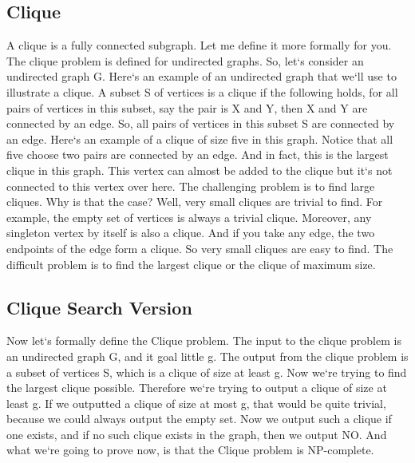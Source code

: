 \subsection{Clique}
A clique is a fully connected subgraph.
Let me define it more formally for you.
The clique problem is defined for undirected graphs.
So, let`s consider an undirected graph G\@.
Here`s an example of an undirected graph that we`ll use to illustrate a clique.
A subset S of vertices is a clique if the following holds, for all pairs of vertices in this subset, say the pair is X and Y, then X and Y are connected by an edge.
So, all pairs of vertices in this subset S are connected by an edge.
Here`s an example of a clique of size five in this graph.
Notice that all five choose two pairs are connected by an edge.
And in fact, this is the largest clique in this graph.
This vertex can almost be added to the clique but it`s not connected to this vertex over here.
The challenging problem is to find large cliques.
Why is that the case? Well, very small cliques are trivial to find.
For example, the empty set of vertices is always a trivial clique.
Moreover, any singleton vertex by itself is also a clique.
And if you take any edge, the two endpoints of the edge form a clique.
So very small cliques are easy to find.
The difficult problem is to find the largest clique or the clique of maximum size.

\subsection{Clique  Search Version}
Now let`s formally define the Clique problem.
The input to the clique problem is an undirected graph G, and it goal little g.
The output from the clique problem is a subset of vertices S, which is a clique of size at least g.
Now we`re trying to find the largest clique possible.
Therefore we`re trying to output a clique of size at least g.
If we outputted a clique of size at most g, that would be quite trivial, because we could always output the empty set.
Now we output such a clique if one exists, and if no such clique exists in the graph, then we output NO\@.
And what we`re going to prove now, is that the Clique problem is NP-complete.

